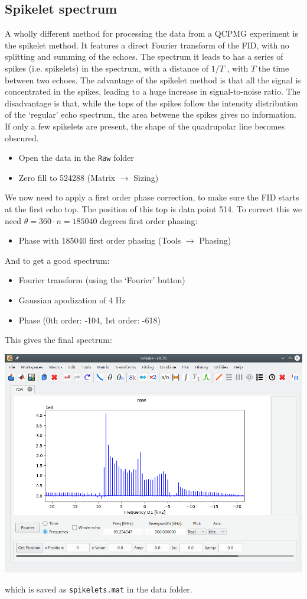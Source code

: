 \documentclass[11pt,a4paper]{article}
\begin{document}
\subsection{Spikelet spectrum}
A wholly different method for processing the data from a QCPMG experiment is the spikelet method. It
features a direct Fourier transform of the FID, with no splitting and summing of the echoes. The
spectrum it leads to has a series of spikes (i.e. spikelets) in the spectrum, with a distance of $1 /T$
, with $T$ the time between two echoes. The advantage of the spikelet method is that all the
signal is concentrated in the spikes, leading to a huge increase in signal-to-noise ratio. The disadvantage is
that, while the tops of the spikes follow the intensity distribution of the `regular' echo spectrum,
the area betwene the spikes gives no information. If only a few spikelets are present, the shape of
the quadrupolar line becomes obscured. 


\begin{itemize}
  \item Open the data in the \texttt{Raw} folder
	\item Zero fill to 524288 (Matrix $\longrightarrow$ Sizing)
\end{itemize}
We now need to apply a first order phase correction, to make sure the FID starts at the first echo
top. The position of this top is data point 514. To correct this we need $\theta = 360 \cdot n =
185040$ degrees first order phasing:


\begin{itemize}
  \item Phase with 185040 first order phasing (Tools $\longrightarrow$ Phasing)

\end{itemize}
And to get a good spectrum:
\begin{itemize}
	\item Fourier transform (using the `Fourier' button)
	\item Gaussian apodization of 4 Hz
	\item Phase (0th order: -104, 1st order: -618)
\end{itemize}
This gives the final spectrum: 
\begin{center}
\includegraphics[width=0.7\linewidth]{Figs/Fig9.png}
\end{center}
which is saved as \texttt{spikelets.mat} in the data folder.
\end{document}
